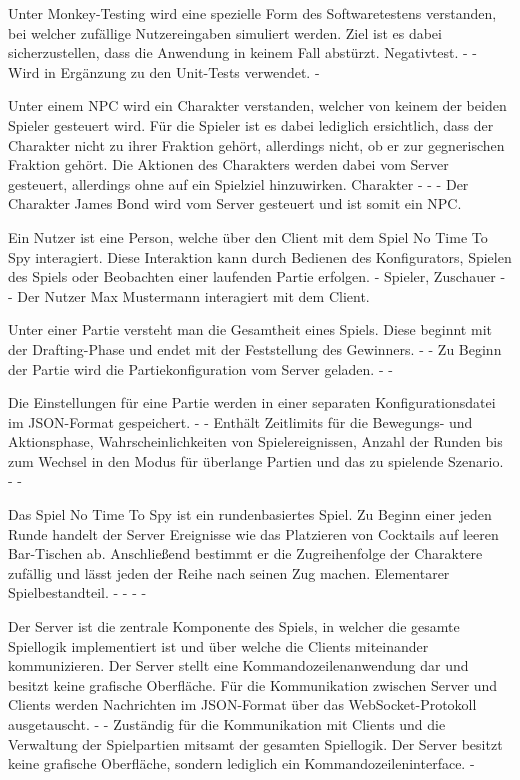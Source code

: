 {Unter Monkey-Testing wird eine spezielle Form des Softwaretestens verstanden, bei welcher zufällige Nutzereingaben simuliert werden. Ziel ist es dabei sicherzustellen, dass die Anwendung in keinem Fall abstürzt.}
{Negativtest.}
{-}
{-}
{Wird in Ergänzung zu den Unit-Tests verwendet.}
{-}

{Unter einem NPC wird ein Charakter verstanden, welcher von keinem der beiden Spieler gesteuert wird. Für die Spieler ist es dabei lediglich ersichtlich, dass der Charakter nicht zu ihrer Fraktion gehört, allerdings nicht, ob er zur gegnerischen Fraktion gehört. Die Aktionen des Charakters werden dabei vom Server gesteuert, allerdings ohne auf ein Spielziel hinzuwirken.}
{Charakter}
{-}
{-}
{-}
{Der Charakter \glqq{}James Bond\grqq{} wird vom Server gesteuert und ist somit ein NPC.}

{Ein Nutzer ist eine Person, welche über den Client mit dem Spiel  \glqq{}No Time To Spy\grqq{} interagiert. Diese Interaktion kann durch Bedienen des Konfigurators, Spielen des Spiels oder Beobachten einer laufenden Partie erfolgen.}
{-}
{Spieler, Zuschauer}
{-}
{-}
{Der Nutzer \glqq{}Max Mustermann\grqq{} interagiert mit dem Client.}

{Unter einer Partie versteht man die Gesamtheit eines Spiels. Diese beginnt mit der Drafting-Phase und endet mit der Feststellung des Gewinners.}
{-}
{-}
{Zu Beginn der Partie wird die Partiekonfiguration vom Server geladen.}
{-}
{-}

{Die Einstellungen für eine Partie werden in einer separaten Konfigurationsdatei im JSON-Format gespeichert. }
{-}
{-}
{Enthält Zeitlimits für die Bewegungs- und Aktionsphase, Wahrscheinlichkeiten von Spielereignissen, Anzahl der Runden bis zum Wechsel in den Modus für überlange Partien und das zu spielende Szenario.}
{-}
{-}

{Das Spiel \glqq{}No Time To Spy\grqq{} ist ein rundenbasiertes Spiel. Zu Beginn einer jeden Runde handelt der Server Ereignisse wie das Platzieren von Cocktails auf leeren Bar-Tischen ab. Anschließend bestimmt er die Zugreihenfolge der Charaktere zufällig und lässt jeden der Reihe nach seinen Zug machen. }
{Elementarer Spielbestandteil.}
{-}
{-}
{-}
{-}

{Der Server ist die zentrale Komponente des Spiels, in welcher die gesamte Spiellogik implementiert ist und über welche die Clients miteinander kommunizieren. Der Server stellt eine Kommandozeilenanwendung dar und besitzt keine grafische Oberfläche. Für die Kommunikation zwischen Server und Clients werden Nachrichten im JSON-Format über das WebSocket-Protokoll ausgetauscht.}
{-}
{-}
{Zuständig für die Kommunikation mit Clients und die Verwaltung der Spielpartien mitsamt der gesamten Spiellogik.}
{Der Server besitzt keine grafische Oberfläche, sondern lediglich ein Kommandozeileninterface.}
{-}

